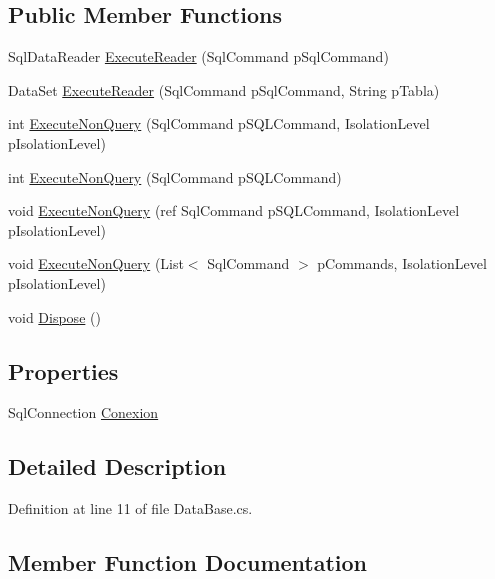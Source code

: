 \subsection*{Public Member Functions}
\begin{DoxyCompactItemize}
\item 
Sql\+Data\+Reader \hyperlink{class_data_base_a096220b5900862d273830cca2d67e072}{Execute\+Reader} (Sql\+Command p\+Sql\+Command)
\item 
Data\+Set \hyperlink{class_data_base_af22453d62fbefc33844ce05471c0ec07}{Execute\+Reader} (Sql\+Command p\+Sql\+Command, String p\+Tabla)
\item 
int \hyperlink{class_data_base_a496a94816107552b090d59a31c9aba33}{Execute\+Non\+Query} (Sql\+Command p\+S\+Q\+L\+Command, Isolation\+Level p\+Isolation\+Level)
\item 
int \hyperlink{class_data_base_ab93baf9d76501c17ba8b31c647137fbf}{Execute\+Non\+Query} (Sql\+Command p\+S\+Q\+L\+Command)
\item 
void \hyperlink{class_data_base_a1ed538956df719cc72f547b079f75ab9}{Execute\+Non\+Query} (ref Sql\+Command p\+S\+Q\+L\+Command, Isolation\+Level p\+Isolation\+Level)
\item 
void \hyperlink{class_data_base_a338f52b6bd35d074adb091765308c9b7}{Execute\+Non\+Query} (List$<$ Sql\+Command $>$ p\+Commands, Isolation\+Level p\+Isolation\+Level)
\item 
void \hyperlink{class_data_base_aa4fda2d540ff490179c2b6e30b02d10b}{Dispose} ()
\end{DoxyCompactItemize}
\subsection*{Properties}
\begin{DoxyCompactItemize}
\item 
Sql\+Connection \hyperlink{class_data_base_a97f57bd5cc885dcd4bb9df4ee4de305d}{Conexion}
\end{DoxyCompactItemize}


\subsection{Detailed Description}


Definition at line 11 of file Data\+Base.\+cs.



\subsection{Member Function Documentation}
\hypertarget{class_data_base_aa4fda2d540ff490179c2b6e30b02d10b}{}\label{class_data_base_aa4fda2d540ff490179c2b6e30b02d10b} 
